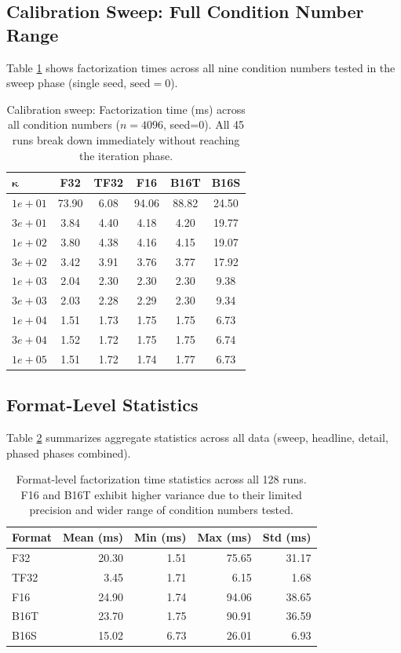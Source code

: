 \documentclass[11pt,a4paper]{article}
\begin{document}
\subsection{Calibration Sweep: Full Condition Number Range}

Table \ref{tab:sweep} shows factorization times across all nine condition numbers tested in the sweep phase (single seed, $\text{seed}=0$).

\begin{table}[!h]
\centering
\begin{tabular}{l c c c c c}
\toprule
$\mathbf{\kappa}$ & F32 & TF32 & F16 & B16T & B16S \\
\midrule
$1e+01$ & 73.90 & 6.08 & 94.06 & 88.82 & 24.50 \\
$3e+01$ & 3.84 & 4.40 & 4.18 & 4.20 & 19.77 \\
$1e+02$ & 3.80 & 4.38 & 4.16 & 4.15 & 19.07 \\
$3e+02$ & 3.42 & 3.91 & 3.76 & 3.77 & 17.92 \\
$1e+03$ & 2.04 & 2.30 & 2.30 & 2.30 & 9.38 \\
$3e+03$ & 2.03 & 2.28 & 2.29 & 2.30 & 9.34 \\
$1e+04$ & 1.51 & 1.73 & 1.75 & 1.75 & 6.73 \\
$3e+04$ & 1.52 & 1.72 & 1.75 & 1.75 & 6.74 \\
$1e+05$ & 1.51 & 1.72 & 1.74 & 1.77 & 6.73 \\
\bottomrule
\end{tabular}
\caption{Calibration sweep: Factorization time (ms) across all condition numbers ($n=4096$, seed=0). All 45 runs break down immediately without reaching the iteration phase.}
\label{tab:sweep}
\end{table}

\subsection{Format-Level Statistics}

Table \ref{tab:format-stats} summarizes aggregate statistics across all data (sweep, headline, detail, phased phases combined).

\begin{table}[!h]
\centering
\begin{tabular}{lrrrr}
\toprule
\textbf{Format} & \textbf{Mean (ms)} & \textbf{Min (ms)} & \textbf{Max (ms)} & \textbf{Std (ms)} \\
\midrule
F32 & 20.30 & 1.51 & 75.65 & 31.17 \\
TF32 & 3.45 & 1.71 & 6.15 & 1.68 \\
F16 & 24.90 & 1.74 & 94.06 & 38.65 \\
B16T & 23.70 & 1.75 & 90.91 & 36.59 \\
B16S & 15.02 & 6.73 & 26.01 & 6.93 \\
\bottomrule
\end{tabular}
\caption{Format-level factorization time statistics across all 128 runs. F16 and B16T exhibit higher variance due to their limited precision and wider range of condition numbers tested.}
\label{tab:format-stats}
\end{table}
\end{document}
